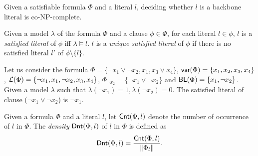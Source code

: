 \begin{theorem}
\label{thm:co-NP}\cite{Jan10}
Given a satisfiable formula $\Phi$ and a literal $l$, deciding whether $l$ is a backbone literal is co-NP-complete.
\end{theorem}

\begin{definition}
Given a model $\lambda$ of the formula $\Phi$ and a clause $\phi\in\Phi$, for each literal $l\in\phi$, $l$ is a \emph{satisfied literal}
of $\phi$ iff $\lambda\models l$. $l$ is a \emph{unique satisfied literal} of $\phi$ if there is no satisfied literal $l'$ of $\phi\setminus\{l\}$.
\end{definition}

Let us consider the formula $\Phi=\{\neg x_1 \vee \neg x_2, x_1, x_3 \vee x_4\}$,
$\textsf{var}(\Phi)=\{x_1, x_2, x_3, x_4\}$, $\Lit(\Phi)=\{\neg x_1, x_1, \neg x_2, x_3, x_4\}$, $\Phi_{\neg x_2}=\{\neg x_1 \vee \neg x_2\}$ and $\textsf{BL}(\Phi)=\{x_1, \neg x_2\}$.
Given a model $\lambda$ such that $\lambda(\neg x_1)=1,\lambda(\neg x_2)=0$. The satisfied literal of clause ($\neg x_1\vee\neg x_2$) is $\neg x_1$.

Given a formula $\Phi$ and a literal $l$, let $\textsf{Cnt}(\Phi,l)$ denote the number of occurrence of $l$ in $\Phi$.
The \emph{density} $\textsf{Dnt}(\Phi,l)$ of $l$ in $\Phi$ is defined as
\[
\textsf{Dnt}(\Phi, l)=\frac{\textsf{Cnt}(\Phi,l)}{\|\Phi_l\|}.
\]

